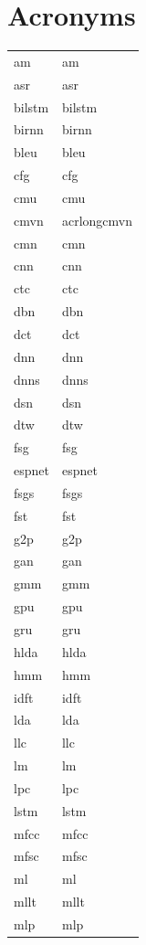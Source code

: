 \documentclass[12pt,twoside]{report}
\begin{document}
\begin{table}[tp]
\chapter*{Acronyms}
  \label{tab:acronymns}
\begin{tabular}{ll}
\acrshort{am} & \acrlong{am}\\
\acrshort{asr} & \acrlong{asr}\\
\acrshort{bilstm} & \acrlong{bilstm}\\
\acrshort{birnn} & \acrlong{birnn}\\
\acrshort{bleu} & \acrlong{bleu}\\
\acrshort{cfg} & \acrlong{cfg} \\
\acrshort{cmu} & \acrlong{cmu} \\
\acrshort{cmvn} & acrlong{cmvn} \\
\acrshort{cmn} & \acrlong{cmn} \\
\acrshort{cnn} & \acrlong{cnn} \\
\acrshort{ctc} & \acrlong{ctc} \\
\acrshort{dbn} & \acrlong{dbn} \\
\acrshort{dct} & \acrlong{dct} \\
\acrshort{dnn} & \acrlong{dnn} \\
\acrshort{dnns} & \acrlong{dnns} \\
\acrshort{dsn} & \acrlong{dsn} \\
\acrshort{dtw} & \acrlong{dtw} \\
\acrshort{fsg} & \acrlong{fsg} \\
\acrshort{espnet} & \acrlong{espnet} \\
\acrshort{fsgs} & \acrlong{fsgs} \\
\acrshort{fst} & \acrlong{fst} \\
\acrshort{g2p} & \acrlong{g2p} \\
\acrshort{gan} & \acrlong{gan} \\
\acrshort{gmm} & \acrlong{gmm} \\
\acrshort{gpu} & \acrlong{gpu} \\
\acrshort{gru} & \acrlong{gru} \\
\acrshort{hlda} & \acrlong{hlda} \\
\acrshort{hmm} & \acrlong{hmm} \\
\acrshort{idft} & \acrlong{idft} \\
\acrshort{lda} & \acrlong{lda} \\
\acrshort{llc} & \acrlong{llc} \\
\acrshort{lm} & \acrlong{lm} \\
\acrshort{lpc} & \acrlong{lpc} \\
\acrshort{lstm} & \acrlong{lstm} \\
\acrshort{mfcc} & \acrlong{mfcc} \\
\acrshort{mfsc} & \acrlong{mfsc} \\
\acrshort{ml} & \acrlong{ml} \\
\acrshort{mllt} & \acrlong{mllt} \\
\acrshort{mlp} & \acrlong{mlp} \\
\end{tabular}
\end{table}
\end{document}
